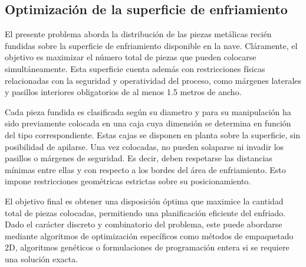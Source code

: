 \subsection{Optimización de la superficie de enfriamiento}
%
%
El presente problema aborda la distribución de las piezas metálicas recién fundidas sobre la superficie de enfriamiento disponible en la nave. Cláramente, el objetivo es maximizar el número total de piezas que pueden colocarse simultáneamente. Esta superficie cuenta además con restricciones físicas relacionadas con la seguridad y operatividad del proceso, como márgenes laterales y pasillos interiores obligatorios de al menos 1.5 metros de ancho.

Cada pieza fundida es clasificada según su diametro y para su manipulación ha sido previamente colocada en una caja cuya dimensión se determina en función del tipo correspondiente. Estas cajas se disponen en planta sobre la superficie, sin posibilidad de apilarse. Una vez colocadas, no pueden solaparse ni invadir los pasillos o márgenes de seguridad. Es decir, deben respetarse las distancias mínimas entre ellas y con respecto a los bordes del área de enfriamiento. Esto impone restricciones geométricas estrictas sobre su posicionamiento.

El objetivo final es obtener una disposición óptima que maximice la cantidad total de piezas colocadas, permitiendo una planificación eficiente del enfriado. Dado el carácter discreto y combinatorio del problema, este puede abordarse mediante algoritmos de optimización específicos como métodos de empaquetado 2D, algoritmos genéticos o formulaciones de programación entera si se requiere una solución exacta.
%
%
